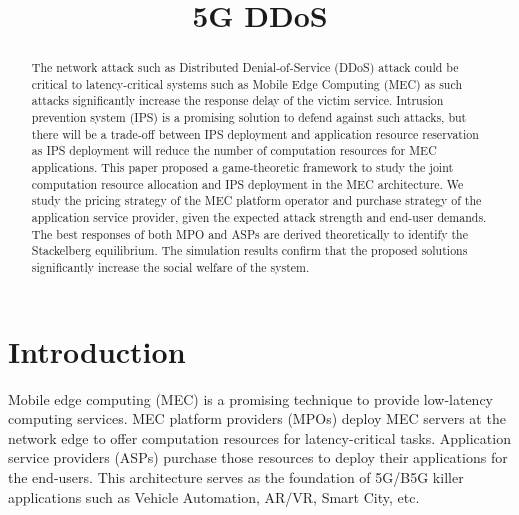 \documentclass[conference]{IEEEtran}
\begin{document}
\title{5G DDoS}
\author{
}
\maketitle

\begin{abstract}
The network attack such as Distributed Denial-of-Service (DDoS) attack could be critical to latency-critical systems such as Mobile Edge Computing (MEC) as such attacks significantly increase the response delay of the victim service. Intrusion prevention system (IPS) is a promising solution to defend against such attacks, but there will be a trade-off between IPS deployment and application resource reservation as IPS deployment will reduce the number of computation resources for MEC applications. This paper proposed a game-theoretic framework to study the joint computation resource allocation and IPS deployment in the MEC architecture. We study the pricing strategy of the MEC platform operator and purchase strategy of the application service provider, given the expected attack strength and end-user demands. The best responses of both MPO and ASPs are derived theoretically to identify the Stackelberg equilibrium. The simulation results confirm that the proposed solutions significantly increase the social welfare of the system.
\end{abstract}

\section{Introduction}
Mobile edge computing (MEC) is a promising technique to provide low-latency computing services. MEC platform providers (MPOs) deploy MEC servers at the network edge to offer computation resources for latency-critical tasks. Application service providers (ASPs) purchase those resources to deploy their applications for the end-users. This architecture serves as the foundation of 5G/B5G killer applications such as Vehicle Automation, AR/VR, Smart City, etc.
\end{document}
